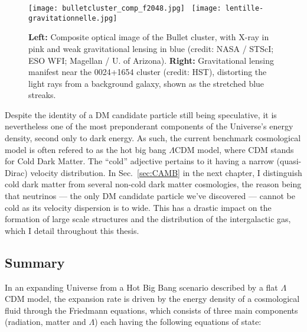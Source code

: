 \begin{figure}
\begin{center}
\texttt{[image: bulletcluster\_comp\_f2048.jpg]}~%
\texttt{[image: lentille-gravitationnelle.jpg]}
\caption{\textbf{Left:} Composite optical image of the Bullet cluster, with X-ray in pink and weak gravitational lensing in blue (credit: NASA / STScI; ESO WFI; Magellan / U. of Arizona). \textbf{Right:} Gravitational lensing manifest near the 0024+1654 cluster (credit: HST), distorting the light rays from a background galaxy, shown as the stretched blue streaks.}
\label{fig:bullet}
\end{center}
\end{figure}

Despite the identity of a DM candidate particle still being speculative, it is nevertheless one of the most preponderant components of the Universe's energy density, second only to dark energy. As such, the current benchmark cosmological model is often refered to as the hot big bang $\Lambda$CDM model, where CDM stands for Cold Dark Matter. The ``cold'' adjective pertains to it having a narrow (quasi-Dirac) velocity distribution. In Sec.~\ref{sec:CAMB} in the next chapter, I distinguish cold dark matter from several non-cold dark matter cosmologies, the reason being that neutrinos --- the only DM candidate particle we've discovered --- cannot be cold as its velocity dispersion is to wide. This has a drastic impact on the formation of large scale structures and the distribution of the intergalactic gas, which I detail throughout this thesis.

\clearpage

\subsection*{Summary}

In an expanding Universe from a Hot Big Bang scenario described by a flat $\Lambda$CDM model, the expansion rate is driven by the energy density of a cosmological fluid through the Friedmann equations, which consists of three main components (radiation, matter and $\Lambda$) each having the following equations of state:\\

